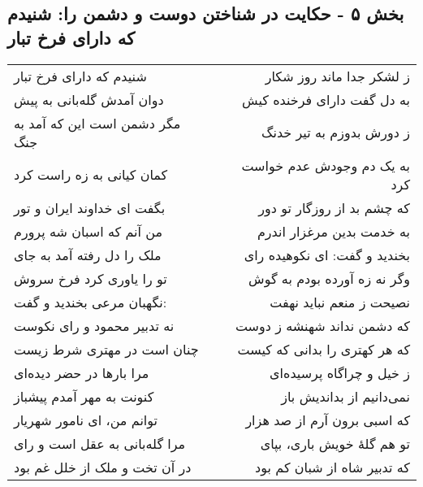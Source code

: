 \begin{center}
\section*{بخش ۵ - حکایت در شناختن دوست و دشمن را: شنیدم که دارای فرخ تبار}
\label{sec:005}
\begin{longtable}{l p{0.5cm} r}
شنیدم که دارای فرخ تبار
&&
ز لشکر جدا ماند روز شکار
\\
دوان آمدش گله‌بانی به پیش
&&
به دل گفت دارای فرخنده کیش
\\
مگر دشمن است این که آمد به جنگ
&&
ز دورش بدوزم به تیر خدنگ
\\
کمان کیانی به زه راست کرد
&&
به یک دم وجودش عدم خواست کرد
\\
بگفت ای خداوند ایران و تور
&&
که چشم بد از روزگار تو دور
\\
من آنم که اسبان شه پرورم
&&
به خدمت بدین مرغزار اندرم
\\
ملک را دل رفته آمد به جای
&&
بخندید و گفت: ای نکوهیده رای
\\
تو را یاوری کرد فرخ سروش
&&
وگر نه زه آورده بودم به گوش
\\
نگهبان مرعی بخندید و گفت:
&&
نصیحت ز منعم نباید نهفت
\\
نه تدبیر محمود و رای نکوست
&&
که دشمن نداند شهنشه ز دوست
\\
چنان است در مهتری شرط زیست
&&
که هر کهتری را بدانی که کیست
\\
مرا بارها در حضر دیده‌ای
&&
ز خیل و چراگاه پرسیده‌ای
\\
کنونت به مهر آمدم پیشباز
&&
نمی‌دانیم از بداندیش باز
\\
توانم من، ای نامور شهریار
&&
که اسبی برون آرم از صد هزار
\\
مرا گله‌بانی به عقل است و رای
&&
تو هم گلهٔ خویش باری، بپای
\\
در آن تخت و ملک از خلل غم بود
&&
که تدبیر شاه از شبان کم بود
\\
\end{longtable}
\end{center}

